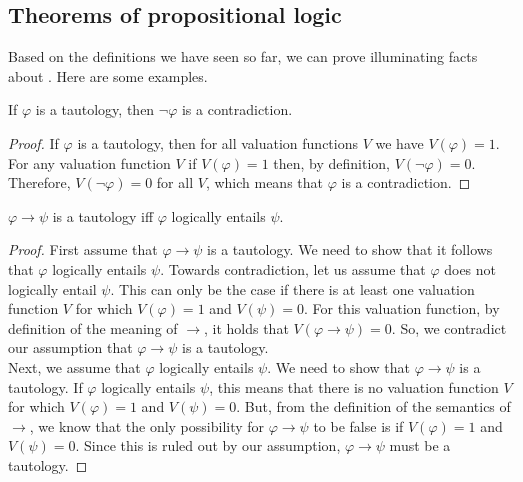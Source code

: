 \documentclass[nobib,nofonts]{tufte-handout}
\newcommand{\proplog}{\acro{PropLog}}
\begin{document}
\subsection{Theorems of propositional logic}

Based on the definitions we have seen so far, we can prove illuminating facts about \proplog.
Here are some examples.

\begin{proposition}
 If $\varphi$ is a tautology, then $\neg \varphi$ is a contradiction.
\end{proposition}

\begin{proof}
  If $\varphi$ is a tautology, then for all valuation functions $V$ we have $V(\varphi) = 1$. For any valuation function $V$ if $V(\varphi) = 1$ then, by definition, $V(\neg \varphi) = 0$. Therefore, $V(\neg \varphi) = 0$ for all $V$, which means that $\varphi$ is a contradiction.
\end{proof}

\begin{proposition}
 $\varphi \rightarrow \psi$ is a tautology iff $\varphi$ logically entails $\psi$.
\end{proposition}

\begin{proof}
  First assume that $\varphi \rightarrow \psi$ is a tautology. We need to show that it follows that $\varphi$ logically entails $\psi$. Towards contradiction, let us assume that $\varphi$ does not logically entail $\psi$. This can only be the case if there is at least one valuation function $V$ for which $V(\varphi) = 1$ and $V(\psi) = 0$. For this valuation function, by definition of the meaning of $\rightarrow$, it holds that $V(\varphi \rightarrow \psi)=0$. So, we contradict our assumption that $\varphi \rightarrow \psi$ is a tautology. \\
  Next, we assume that $\varphi$ logically entails $\psi$. We need to show that $\varphi \rightarrow \psi$ is a tautology. If $\varphi$ logically entails $\psi$, this means that there is no valuation function $V$ for which $V(\varphi)=1$ and $V(\psi)=0$. But, from the definition of the semantics of $\rightarrow$, we know that the only possibility for $\varphi \rightarrow \psi$ to be false is if $V(\varphi)=1$ and $V(\psi)=0$. Since this is ruled out by our assumption, $\varphi \rightarrow \psi$ must be a tautology.
\end{proof}
\end{document}
